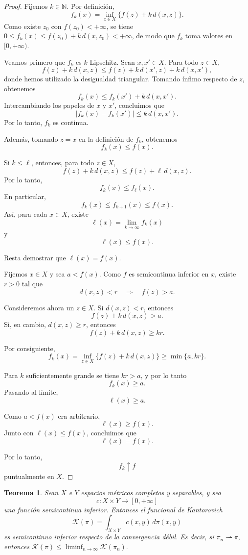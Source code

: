 \documentclass[12pt, a4paper]{amsbook}
\newtheorem{teo}{Teorema}[section]
\theoremstyle{remark}
\theoremstyle{definition}
\numberwithin{section}{chapter}
\numberwithin{subsection}{section}
\numberwithin{equation}{section}
\numberwithin{figure}{chapter}
\begin{document}
\begin{proof}
Fijemos \(k\in\mathbb N\). Por definición,
\[
f_k(x)
=
\inf_{z\in X}
\bigl\{
f(z)+k\,d(x,z)
\bigr\}.
\]
Como existe \(z_0\) con \(f(z_0)<+\infty\), se tiene
\(0\le f_k(x)\le f(z_0)+k\,d(x,z_0)<+\infty\), de modo que \(f_k\) toma
valores en \([0,+\infty)\).

Veamos primero que \(f_k\) es \(k\)-Lipschitz. Sean \(x,x'\in X\).
Para todo \(z\in X\),
\[
f(z)+k\,d(x,z)
\leq
f(z)+k\,d(x',z)+k\,d(x,x'),
\]
donde hemos utilizado la desigualdad triangular. Tomando ínfimo respecto de
\(z\), obtenemos
\[
f_k(x)
\leq
f_k(x')+k\,d(x,x').
\]
Intercambiando los papeles de \(x\) y \(x'\), concluimos que
\[
|f_k(x)-f_k(x')|
\leq
k\,d(x,x').
\]
Por lo tanto, \(f_k\) es continua.

Además, tomando \(z=x\) en la definición de \(f_k\), obtenemos
\[
f_k(x)\leq f(x).
\]

Si \(k\leq\ell\), entonces, para todo \(z\in X\),
\[
f(z)+k\,d(x,z)
\leq
f(z)+\ell\,d(x,z).
\]
Por lo tanto,
\[
f_k(x)\leq f_\ell(x).
\]
En particular,
\[
f_k(x)\leq f_{k+1}(x)\leq f(x).
\]
Así, para cada \(x\in X\), existe
\[
\ell(x)=\lim_{k\to\infty}f_k(x)
\]
y
\[
\ell(x)\leq f(x).
\]

Resta demostrar que \(\ell(x)=f(x)\).

Fijemos \(x\in X\) y sea \(a<f(x)\). Como \(f\) es semicontinua inferior
en \(x\), existe \(r>0\) tal que
\[
d(x,z)<r
\quad\Longrightarrow\quad
f(z)>a.
\]

Consideremos ahora un \(z\in X\). Si \(d(x,z)<r\), entonces
\[
f(z)+k\,d(x,z)>a.
\]
Si, en cambio, \(d(x,z)\geq r\), entonces
\[
f(z)+k\,d(x,z)\geq kr.
\]

Por consiguiente,
\[
f_k(x)
=
\inf_{z\in X}
\bigl\{
f(z)+k\,d(x,z)
\bigr\}
\geq
\min\{a,kr\}.
\]

Para \(k\) suficientemente grande se tiene \(kr>a\), y por lo tanto
\[
f_k(x)\geq a.
\]
Pasando al límite,
\[
\ell(x)\geq a.
\]

Como \(a<f(x)\) era arbitrario,
\[
\ell(x)\geq f(x).
\]
Junto con \(\ell(x)\leq f(x)\), concluimos que
\[
\ell(x)=f(x).
\]

Por lo tanto,
\[
f_k\uparrow f
\]
puntualmente en \(X\).
\end{proof}

\begin{teo}\label{teo.K.sci}
Sean \(X\) e \(Y\) espacios métricos completos y separables, y sea
\[
c\colon X\times Y\longrightarrow[0,+\infty]
\]
una función semicontinua inferior. Entonces el funcional de Kantorovich
\[
\mathcal K(\pi)
=
\int_{X\times Y}c(x,y)\,d\pi(x,y)
\]
es semicontinuo inferior respecto de la convergencia débil. Es decir, si
\(
\pi_n\rightharpoonup\pi,
\)
entonces
\(
\mathcal K(\pi)
\leq
\liminf_{n\to\infty}\mathcal K(\pi_n).
\)
\end{teo}
\end{document}

